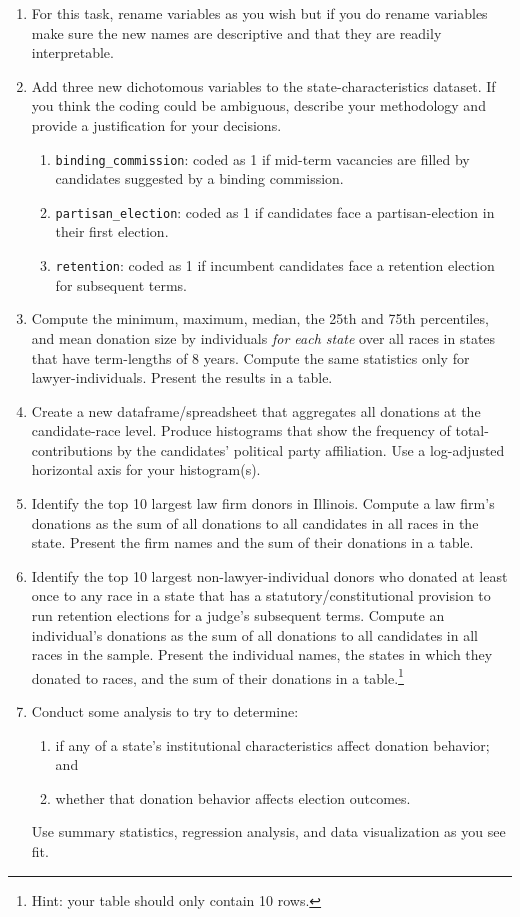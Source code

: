 \documentclass[11pt, letterpaper, twoside]{article}
\begin{document}
\begin{enumerate}
    \item For this task, rename variables as you wish but if you do rename variables make sure the new names are descriptive and that they are readily interpretable. 
    \item Add three new dichotomous variables to the state-characteristics dataset. If you think the coding could be ambiguous, describe your methodology and provide a justification for your decisions.
    \begin{enumerate}[label=\alph*.]
        \item \verb|binding_commission|: coded as 1 if mid-term vacancies are filled by candidates suggested by a binding commission.
        \item \verb|partisan_election|: coded as 1 if candidates face a partisan-election in their first election. 
        \item \verb|retention|: coded as 1 if incumbent candidates face a retention election for subsequent terms.
    \end{enumerate}
    \item Compute the minimum, maximum, median, the 25th and 75th percentiles, and mean donation size by individuals \textit{for each state} over all races in states that have term-lengths of 8 years. Compute the same statistics only for lawyer-individuals. Present the results in a table. 
    \item Create a new dataframe/spreadsheet that aggregates all donations at the candidate-race level. Produce histograms that show the frequency of total-contributions by the candidates' political party affiliation. Use a log-adjusted horizontal axis for your histogram(s).
    \item Identify the top 10 largest law firm donors in Illinois. Compute a law firm's donations as the sum of all donations to all candidates in all races in the state. Present the firm names and the sum of their donations in a table.
    \item Identify the top 10 largest non-lawyer-individual donors who donated at least once to any race in a state that has a statutory/constitutional provision to run retention elections for a judge's subsequent terms. Compute an individual's donations as the sum of all donations to all candidates in all races in the sample. Present the individual names, the states in which they donated to races, and the sum of their donations in a table.\footnote{Hint: your table should only contain 10 rows.} 
    \item Conduct some analysis to try to determine:
    \begin{enumerate}[label=\alph*.]
        \item if any of a state's institutional characteristics affect donation behavior; and 
        \item whether that donation behavior affects election outcomes.
    \end{enumerate}
    Use summary statistics, regression analysis, and data visualization as you see fit.
\end{enumerate}
\end{document}
